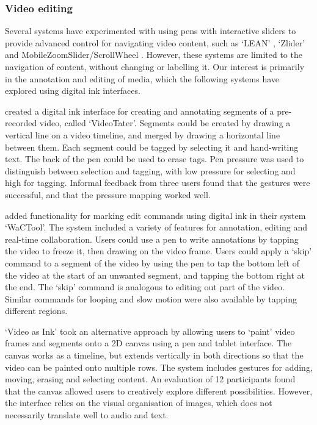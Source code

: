 \subsubsection{Video editing}
Several systems have experimented with using pens with interactive sliders to provide advanced control for
navigating video content, such as `LEAN' \citep{Ramos2003}, `Zlider' \citep{Ramos2005} and MobileZoomSlider/ScrollWheel
\citep{Huerst2008}. However, these systems are limited to the navigation of content, without changing or labelling it.
Our interest is primarily in the annotation and editing of media, which the following systems have explored using
digital ink interfaces.

\citet{Diakopoulos2006} created a digital ink interface for creating and annotating segments of a pre-recorded video,
called `VideoTater'. Segments could be created by drawing a vertical line on a video timeline, and merged by drawing a
horizontal line between them. Each segment could be tagged by selecting it and hand-writing text. The back of
the pen could be used to erase tags. Pen pressure was used to distinguish between selection and tagging, with low
pressure for selecting and high for tagging. Informal feedback from three users found that the gestures were
successful, and that the pressure mapping worked well.

\citet{Cattelan2008} added functionality for marking edit commands using digital ink in their system `WaCTool'. The
system included a variety of features for annotation, editing and real-time collaboration. Users could use a pen to
write annotations by tapping the video to freeze it, then drawing on the video frame.  Users could apply a `skip'
command to a segment of the video by using the pen to tap the bottom left of the video at the start of an unwanted
segment, and tapping the bottom right at the end. The `skip' command is analogous to editing out part of the video.
Similar commands for looping and slow motion were also available by tapping different regions.

`Video as Ink' \citep{Cabral2016} took an alternative approach by allowing users to `paint' video frames and segments
onto a 2D canvas using a pen and tablet interface. The canvas works as a timeline, but extends vertically in both
directions so that the video can be painted onto multiple rows. The system includes gestures for adding, moving,
erasing and selecting content. An evaluation of 12 participants found that the canvas allowed users to creatively
explore different possibilities. However, the interface relies on the visual organisation of images, which does not
necessarily translate well to audio and text.

